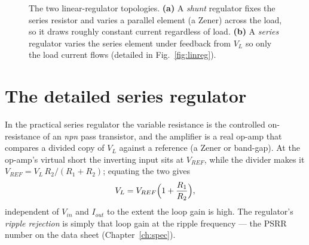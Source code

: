 \documentclass[11pt,a4paper,oneside]{book}
\begin{document}
\begin{figure}[h]\centering
{}
\caption{The two linear-regulator topologies. \textbf{(a)} A \emph{shunt} regulator
fixes the series resistor and varies a parallel element (a Zener) across the load, so it
draws roughly constant current regardless of load. \textbf{(b)} A \emph{series} regulator
varies the series element under feedback from $V_L$ so only the load current flows
(detailed in Fig.~\ref{fig:linreg}).}
\label{fig:lvr-types}
\end{figure}

\section{The detailed series regulator}
In the practical series regulator the variable resistance is the controlled
on-resistance of an \emph{npn} pass transistor, and the amplifier is a real op-amp that
compares a divided copy of $V_L$ against a reference (a Zener or band-gap). At the
op-amp's virtual short the inverting input sits at $V_{REF}$, while the divider makes it
$V_{REF}=V_L\,R_2/(R_1+R_2)$; equating the two gives
\[ V_L = V_{REF}\Bigl(1+\frac{R_1}{R_2}\Bigr), \]
independent of $V_{in}$ and $I_{out}$ to the extent the loop gain is high. The
regulator's \emph{ripple rejection} is simply that loop gain at the ripple frequency ---
the PSRR number on the data sheet (Chapter~\ref{ch:spec}).
\end{document}
